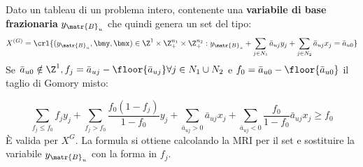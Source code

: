 \documentclass[\main/main.tex]{subfiles}
\begin{document}
\begin{proposition}
    Dato un tableau di un problema intero, contenente una \textbf{variabile di base frazionaria} \(y_{\matr{B}_u}\) che quindi genera un set del tipo:
    \[
        X^{(G)} = \crl{(y_{\matr{B}_u}, \bmy, \bmx) \in \Z^1 \times \Z^{n_1}_+ \times \Z^{n_2}_+: y_{\matr{B}_u} + \sum_{j \in N_1} \bar{a}_{uj}y_j + \sum_{j \in N_2} \bar{a}_{uj}x_j = \bar{a}_{u0}}
    \]    Se \(\bar{a}_{u0} \notin \Z^1, f_j = \bar{a}_{uj} - \floor{\bar{a}_{uj}} \forall j \in N_1 \cup N_2\) e \(f_0 = \bar{a}_{u0} - \floor{\bar{a}_{u0}}\) il taglio di Gomory misto:

    \[
        \sum_{f_j\leq f_0} f_j y_j + \sum_{f_j > f_0} \frac{f_0(1-f_j)}{1-f_0}y_j + \sum_{\bar{a}_{uj}>0} \bar{a}_{uj} x_j + \sum_{\bar{a}_{uj}<0} \frac{f_0}{1-f_0}\bar{a}_{uj} x_j \geq f_0
    \]    È valida per \(X^G\). La formula si ottiene calcolando la MRI per il set e sostituire la variabile \(y_{\matr{B}_u}\) con la forma in \(f_j\).
\end{proposition}
\end{document}
